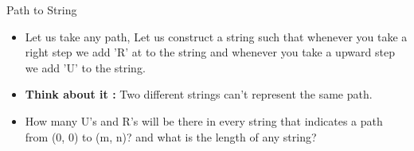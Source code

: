 \begin{frame}{Path to String}
    \begin{itemize}
        \item Let us take any path, Let us construct a string such that whenever you take a right step we add 'R' at to the string and whenever you take a upward step we add 'U' to the string.
        \pause
        \item {\bf{Think about it :}} Two different strings can't represent the same path.
        \pause
        \item How many U's and R's will be there in every string that indicates a path from (0, 0) to (m, n)? and what is the length of any string?
    \end{itemize}
\end{frame}